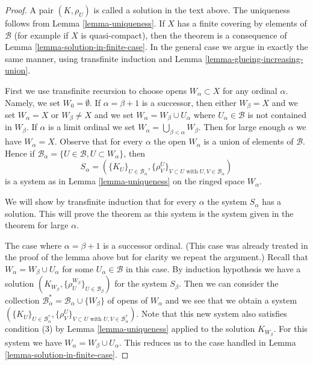 \begin{proof}
A pair $(K, \rho_U)$ is called a solution in the text above.
The uniqueness follows from Lemma \ref{lemma-uniqueness}.
If $X$ has a finite covering by elements of $\mathcal{B}$
(for example if $X$ is quasi-compact), then the theorem
is a consequence of Lemma \ref{lemma-solution-in-finite-case}.
In the general case we argue in exactly the same manner,
using transfinite induction and
Lemma \ref{lemma-glueing-increasing-union}.

\medskip\noindent
First we use transfinite recursion to choose opens $W_\alpha \subset X$
for any ordinal $\alpha$. Namely, we set $W_0 = \emptyset$.
If $\alpha = \beta + 1$ is a successor, then either $W_\beta = X$
and we set $W_\alpha = X$ or $W_\beta \not = X$ and we set
$W_\alpha = W_\beta \cup U_\alpha$ where
$U_\alpha \in \mathcal{B}$ is not contained in $W_\beta$.
If $\alpha$ is a limit ordinal we set
$W_\alpha = \bigcup_{\beta < \alpha} W_\beta$.
Then for large enough $\alpha$ we have $W_\alpha = X$.
Observe that for every $\alpha$ the open $W_\alpha$ is
a union of elements of $\mathcal{B}$. Hence if
$\mathcal{B}_\alpha = \{U \in \mathcal{B}, U \subset W_\alpha\}$, then
$$
S_\alpha = (\{K_U\}_{U \in \mathcal{B}_\alpha},
\{\rho_V^U\}_{V \subset U\text{ with }U, V \in \mathcal{B}_\alpha})
$$
is a system as in Lemma \ref{lemma-uniqueness} on the ringed space $W_\alpha$.

\medskip\noindent
We will show by transfinite induction that for every $\alpha$
the system $S_\alpha$ has a solution. This will prove the theorem
as this system is the system given in the theorem for large $\alpha$.

\medskip\noindent
The case where $\alpha = \beta + 1$ is a successor ordinal.
(This case was already treated in the proof of the lemma above
but for clarity we repeat the argument.)
Recall that $W_\alpha = W_\beta \cup U_\alpha$ for some
$U_\alpha \in \mathcal{B}$ in this case.
By induction hypothesis we have a solution
$(K_{W_\beta}, \{\rho^{W_\beta}_U\}_{U \in \mathcal{B}_\beta})$
for the system $S_\beta$.
Then we can consider the collection
$\mathcal{B}_\alpha^* = \mathcal{B}_\alpha \cup \{W_\beta\}$
of opens of $W_\alpha$ and we see that we obtain a system
$(\{K_U\}_{U \in \mathcal{B}_\alpha^*},
\{\rho_V^U\}_{V \subset U\text{ with }U, V \in \mathcal{B}_\alpha^*})$.
Note that this new system also satisfies condition (3)
by Lemma \ref{lemma-uniqueness} applied to the solution $K_{W_\beta}$.
For this system we have $W_\alpha = W_\beta \cup U_\alpha$.
This reduces us to the case handled in
Lemma \ref{lemma-solution-in-finite-case}.


\end{proof}
